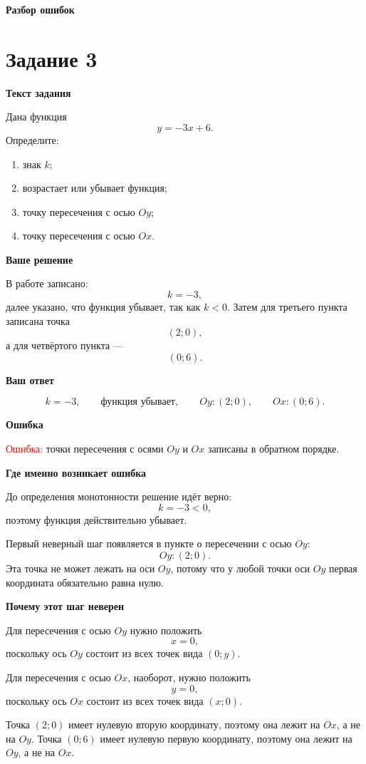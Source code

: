 \documentclass[12pt,a4paper]{article}
\newcommand{\reviewhead}[1]{%
  \par\medskip
  \noindent\textbf{#1}\par\smallskip
}
\begin{document}
\newpage
\vspace*{\fill}
\begin{center}
{\LARGE\bfseries Разбор ошибок}
\end{center}
\vspace*{\fill}
\newpage

\label{task:3}
\section*{Задание 3}

\reviewhead{Текст задания}
Дана функция
\[
y=-3x+6.
\]
Определите:
\begin{enumerate}
\item знак \(k\);
\item возрастает или убывает функция;
\item точку пересечения с осью \(Oy\);
\item точку пересечения с осью \(Ox\).
\end{enumerate}

\reviewhead{Ваше решение}
В работе записано:
\[
k=-3,
\]
далее указано, что функция убывает, так как \(k<0\). Затем для третьего пункта записана точка
\[
(2;0),
\]
а для четвёртого пункта ---
\[
(0;6).
\]

\reviewhead{Ваш ответ}
\[
k=-3,\qquad \text{функция убывает},\qquad
Oy:(2;0),\qquad Ox:(0;6).
\]

\reviewhead{Ошибка}
\textcolor{red}{Ошибка:} точки пересечения с осями \(Oy\) и \(Ox\) записаны в обратном порядке.

\reviewhead{Где именно возникает ошибка}
До определения монотонности решение идёт верно:
\[
k=-3<0,
\]
поэтому функция действительно убывает.

Первый неверный шаг появляется в пункте о пересечении с осью \(Oy\):
\[
Oy:(2;0).
\]
Эта точка не может лежать на оси \(Oy\), потому что у любой точки оси \(Oy\) первая координата обязательно равна нулю.

\reviewhead{Почему этот шаг неверен}
Для пересечения с осью \(Oy\) нужно положить
\[
x=0,
\]
поскольку ось \(Oy\) состоит из всех точек вида \((0;y)\).

Для пересечения с осью \(Ox\), наоборот, нужно положить
\[
y=0,
\]
поскольку ось \(Ox\) состоит из всех точек вида \((x;0)\).

Точка \((2;0)\) имеет нулевую вторую координату, поэтому она лежит на \(Ox\), а не на \(Oy\).
Точка \((0;6)\) имеет нулевую первую координату, поэтому она лежит на \(Oy\), а не на \(Ox\).
\end{document}
